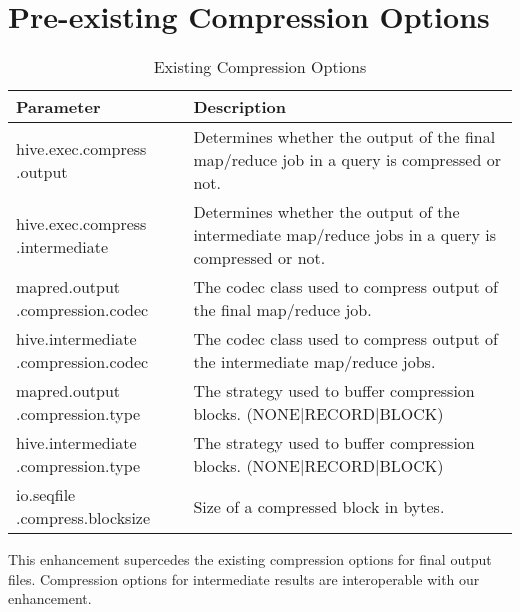 \documentclass[11pt,a4paper]{article}
\begin{document}
\section{Pre-existing Compression Options}
	\begin{table}[H]
		\begin{tabular}{| p{3.5cm} | p{7.5cm} |} \hline
			
			\textbf{Parameter} & \textbf{Description} \\ \hline
			hive.exec.compress\linebreak
			.output
			& Determines whether the output of the final map/reduce job in a query is compressed or not.
			\\ \hline
			
			hive.exec.compress\linebreak
			.intermediate
			& Determines whether the output of the intermediate map/reduce jobs in a query is compressed or not.
			\\ \hline
			
			mapred.output\linebreak
			.compression.codec
			& The codec class used to compress output of the final map/reduce job. 
			\\ \hline
			
			hive.intermediate\linebreak
			.compression.codec
			& The codec class used to compress output of the intermediate map/reduce jobs. 
			\\ \hline
			
			mapred.output\linebreak
			.compression.type
			& The strategy used to buffer compression blocks. (NONE|RECORD|BLOCK) 
			\\ \hline
			
			hive.intermediate\linebreak
			.compression.type
			& The strategy used to buffer compression blocks. (NONE|RECORD|BLOCK) 
			\\ \hline
			
			io.seqfile\linebreak
			.compress.blocksize
			& Size of a compressed block in bytes. 
			\\ \hline
			
		\end{tabular}
		\caption{Existing Compression Options}
	\end{table}
	
	This enhancement supercedes the existing compression options for final output files. Compression options for intermediate results are interoperable with our enhancement.
	
\end{document}
